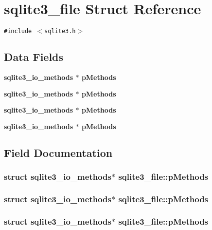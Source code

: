 \section{sqlite3\_\-file Struct Reference}
\label{structsqlite3__file}
{\tt \#include $<$sqlite3.h$>$}

\subsection*{Data Fields}
\begin{CompactItemize}
\item 
\bf{sqlite3\_\-io\_\-methods} $\ast$ \bf{p\-Methods}
\item 
\bf{sqlite3\_\-io\_\-methods} $\ast$ \bf{p\-Methods}
\item 
\bf{sqlite3\_\-io\_\-methods} $\ast$ \bf{p\-Methods}
\item 
\bf{sqlite3\_\-io\_\-methods} $\ast$ \bf{p\-Methods}
\end{CompactItemize}


\subsection{Field Documentation}
\subsubsection{\setlength{\rightskip}{0pt plus 5cm}struct \bf{sqlite3\_\-io\_\-methods}$\ast$ \bf{sqlite3\_\-file::p\-Methods}}\label{structsqlite3__file_82bf9166e50a8f3cd10f7ee84c4a4986}


\subsubsection{\setlength{\rightskip}{0pt plus 5cm}struct \bf{sqlite3\_\-io\_\-methods}$\ast$ \bf{sqlite3\_\-file::p\-Methods}}\label{structsqlite3__file_82bf9166e50a8f3cd10f7ee84c4a4986}


\subsubsection{\setlength{\rightskip}{0pt plus 5cm}struct \bf{sqlite3\_\-io\_\-methods}$\ast$ \bf{sqlite3\_\-file::p\-Methods}}\label{structsqlite3__file_82bf9166e50a8f3cd10f7ee84c4a4986}


